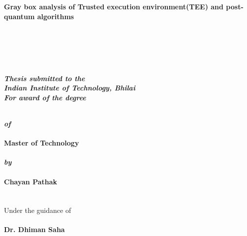 \thispagestyle{empty}
\vspace{-15mm}
\begin{center}
	\begin{Spacing}{1.5}
    \textbf{\Large Gray box analysis of Trusted execution environment(TEE) and post-quantum algorithms} \\
   	\end{Spacing}
	\hspace{0pt plus 1filll} \\
	\hspace{0pt plus 1filll} \\
	\hspace{0pt plus 1filll} \\
	\hspace{0pt plus 1filll} \\
	\begin{Spacing}{1.4}
    \textbf{\emph{ Thesis submitted to the}} \\ 
   	\textbf{\emph{ Indian Institute of Technology, Bhilai}}\\
   	\textbf{\emph{ For award of the degree}}\\
   	\end{Spacing}
	\hspace{0pt plus 1filll} \\
    \textbf{ \emph{of}}\\
	\hspace{0pt plus 1filll} \\
    \textbf{ Master of Technology}\\
	\hspace{0pt plus 1filll} \\
    \textbf{\emph{ by}}\\
	\hspace{0pt plus 1filll} \\
    \textbf{ Chayan Pathak}\\
	\hspace{0pt plus 1filll} \\
	\hspace{0pt plus 1filll} \\
    { Under the guidance of}\\
	\hspace{0pt plus 1filll} \\
    \textbf{ Dr. Dhiman Saha} 
    \begin{figure}[h]
    \centering

\end{figure}
\end{center}
